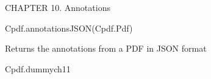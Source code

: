 CHAPTER 10. Annotations

Cpdf.annotationsJSON(Cpdf.Pdf)

Returns the annotations from a PDF in JSON format

Cpdf.dummych11

